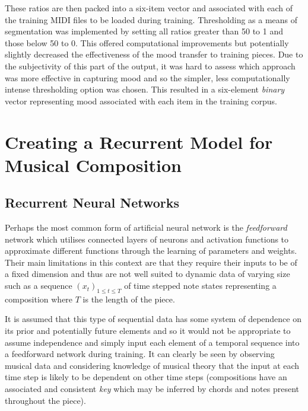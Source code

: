 \documentclass[12pt,]{article}
\begin{document}
These ratios are then packed into a six-item vector and associated with
each of the training MIDI files to be loaded during training.
Thresholding as a means of segmentation was implemented by setting all
ratios greater than 50 to 1 and those below 50 to 0. This offered
computational improvements but potentially slightly decreased the
effectiveness of the mood transfer to training pieces. Due to the
subjectivity of this part of the output, it was hard to assess which
approach was more effective in capturing mood and so the simpler, less
computationally intense thresholding option was chosen. This resulted in
a six-element \emph{binary} vector representing mood associated with
each item in the training corpus.

\hypertarget{creating-a-recurrent-model-for-musical-composition}{%
\section{Creating a Recurrent Model for Musical
Composition}\label{creating-a-recurrent-model-for-musical-composition}}

\hypertarget{recurrent-neural-networks}{%
\subsection{Recurrent Neural Networks}\label{recurrent-neural-networks}}

Perhaps the most common form of artificial neural network is the
\emph{feedforward} network which utilises connected layers of neurons
and activation functions to approximate different functions through the
learning of parameters and weights. Their main limitations in this
context are that they require their inputs to be of a fixed dimension
and thus are not well suited to dynamic data of varying size such as a
sequence \((x_t)_{1\le t\le T}\) of time stepped note states
representing a composition where \(T\) is the length of the piece.

It is assumed that this type of sequential data has some system of
dependence on its prior and potentially future elements and so it would
not be appropriate to assume independence and simply input each element
of a temporal sequence into a feedforward network during training. It
can clearly be seen by observing musical data and considering knowledge
of musical theory that the input at each time step is likely to be
dependent on other time steps (compositions have an associated and
consistent \emph{key} which may be inferred by chords and notes present
throughout the piece).
\end{document}
